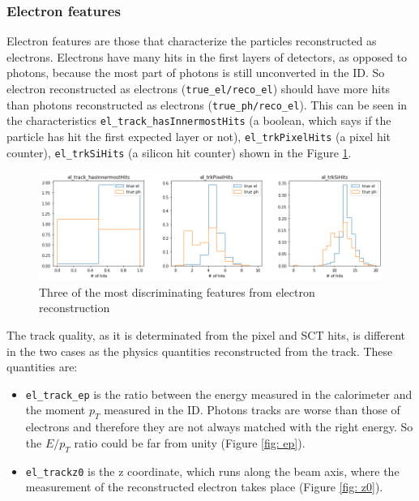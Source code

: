 \documentclass[a4paper, oneside, 11pt, openright]{book}
\begin{document}
				\subsubsection{Electron features}
					Electron features are those that characterize the particles reconstructed as electrons. Electrons have many hits in the first layers of detectors, as opposed to photons, because the most part of photons is still unconverted in the ID. So electron reconstructed as electrons (\texttt{true\_el/reco\_el}) should have more hits than photons reconstructed as electrons (\texttt{true\_ph/reco\_el}). This can be seen in the characteristics \texttt{el\_track\_hasInnermostHits} (a boolean, which says if the particle has hit the first expected layer or not), \texttt{el\_trkPixelHits} (a pixel hit counter), \texttt{el\_trkSiHits} (a silicon hit counter) shown in the Figure \ref{fig:el_hit}.
					\begin{figure}[h!]
						\centering
						\includegraphics[width=0.7\textheight]{tesi_images/el_hit.png}
						\caption{Three of the most discriminating features from electron reconstruction}
						\label{fig:el_hit}
					\end{figure}
					
					The track quality, as it is determinated from the pixel and SCT hits, is different in the two cases as the physics quantities reconstructed from the track. These quantities are:
					\begin{itemize}
						\item \texttt{el\_track\_ep} is the ratio between the energy measured in the calorimeter and the moment $p_T$ measured in the ID. Photons tracks are worse than those of electrons and therefore they are not always matched with the right energy. So the $E/p_T$ ratio could be far from unity (Figure \ref{fig: ep}).
						\item \texttt{el\_trackz0} is the z coordinate, which runs along the beam axis, where the measurement of the reconstructed electron takes place (Figure \ref{fig: z0}).
					\end{itemize}
				
\end{document}
